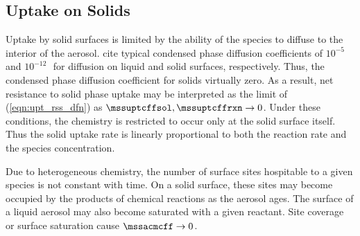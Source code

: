 \documentclass[12pt,twoside]{book}
\newcounter{reaction} %
\begin{document}
\subsection[Uptake on Solids]{Uptake on Solids}\label{sxn:sld}
Uptake by solid surfaces is limited by the ability of the species to
diffuse to the interior of the aerosol.
\cite{KWZ95} cite typical condensed phase diffusion coefficients of
$10^{-5}$ and $10^{-12}$\,\cmSxs\ for diffusion on liquid and solid
surfaces, respectively. 
Thus, the condensed phase diffusion coefficient for solids virtually
zero. 
As a result, net resistance to solid phase uptake may be interpreted
as the limit of (\ref{eqn:upt_rss_dfn}) as $\mssuptcffsol,
\mssuptcffrxn \rightarrow 0$.
Under these conditions, the chemistry is restricted to occur only at
the solid surface itself.
Thus the solid uptake rate is linearly proportional to both the
reaction rate and the species concentration. 

Due to heterogeneous chemistry, the number of surface sites hospitable
to a given species is not constant with time.
On a solid surface, these sites may become occupied by the products of
chemical reactions as the aerosol ages.
The surface of a liquid aerosol may also become saturated with a given  
reactant.
Site coverage or surface saturation cause $\mssacmcff \rightarrow 0$.
\end{document}
